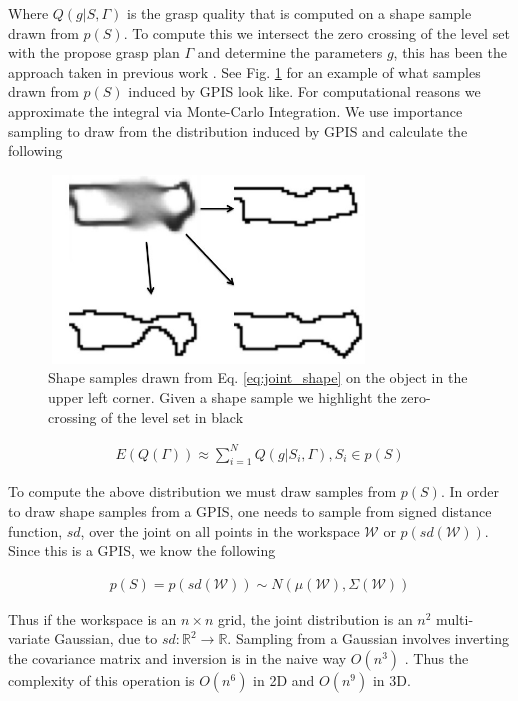 \documentclass[letterpaper, 10 pt, conference]{ieeeconf}  %
\begin{document}
Where $Q(g|S,\Gamma)$ is the grasp quality that is computed on a shape sample drawn from $p(S)$. To compute this we intersect the zero crossing of the level set with the propose grasp plan $\Gamma$ and determine the parameters $g$, this has been the approach taken in previous work  \cite{kehoe2012estimating} \cite{kehoe2012toward} \cite{christopoulos2007handling}. See Fig. \ref{fig:shape_samples} for an example of what samples drawn from $p(S)$ induced by GPIS look like. For computational reasons we approximate the integral via Monte-Carlo Integration. We use importance sampling to draw from the distribution induced by GPIS and calculate the following

\begin{figure}[ht!]
\centering
\includegraphics[width = 8.5cm, height= 5cm ]{figures/Slide13.jpg}
\caption{Shape samples drawn from Eq. \ref{eq:joint_shape} on the object in the upper left corner. Given a shape sample we highlight the zero-crossing of the level set in black}
\vspace*{-10pt}
\label{fig:shape_samples}
\end{figure}

\begin{align*}
E(Q(\Gamma)) \approx \sum_{i=1}^N Q(g|S_i,\Gamma) , S_i \in p(S)
\end{align*}

To compute the above distribution we must draw samples from $p(S)$. In order to draw shape samples from a GPIS, one needs to sample from signed distance function, $sd$, over the joint on all points in the workspace $\mathcal{W}$ or $p(sd(\mathcal{W}))$. Since this is a GPIS, we know the following 

\begin{align}\label{eq:joint_shape}
p(S) = p(sd(\mathcal{W})) \sim N(\mu(\mathcal{W}),\Sigma(\mathcal{W}))
\end{align}

Thus if the workspace is an $n \times n$ grid, the joint distribution is an  $n^2$ multi-variate Gaussian, due to $sd:\mathbb{R}^2 \rightarrow \mathbb{R}$.  Sampling from a Gaussian involves inverting the covariance matrix and inversion is in the naive way $O(n^3)$ \cite{petersen2008matrix}. Thus the complexity of this operation is $O(n^6)$ in 2D and $O(n^9)$ in 3D. 
\end{document}
